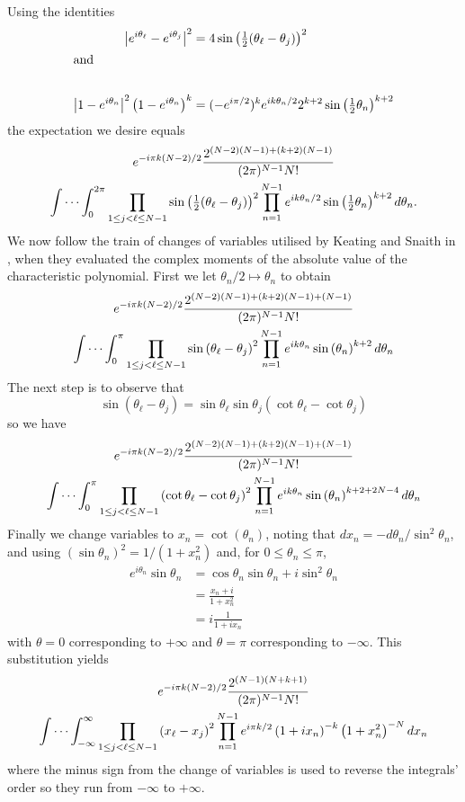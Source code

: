 \documentclass[12pt,a4paper,reqno]{amsart}
\theoremstyle{remark}
\numberwithin{equation}{section}
\begin{document}
Using the identities
\begin{align*}
\left|e^{i\theta_\ell} - e^{i\theta_j} \right|^2 &= 4\sin\left(\tfrac12(\theta_\ell - \theta_j)\right)^2 \\
\intertext{and}\\
\left|1-e^{i\theta_n}\right|^2 \left(1-e^{i\theta_n}\right)^k  &= (- e^{i\pi /2})^k e^{i k \theta_n/2} 2^{k+2} \sin\left(\tfrac12 \theta_n\right)^{k+2}
\end{align*}
the expectation we desire equals
\begin{multline*}
e^{-i\pi k(N-2)/2} \frac{2^{(N-2)(N-1) + (k+2)(N-1)}}{(2\pi)^{N-1} N!} \\
\idotsint_0^{2\pi} \prod_{1 \leq j < \ell \leq N-1} \sin\left(\tfrac12(\theta_\ell - \theta_j)\right)^2  \prod_{n=1}^{N-1}  e^{i k \theta_n/2} \sin\left(\tfrac12 \theta_n\right)^{k+2}  d\theta_n .
\end{multline*}
We now follow the train of changes of variables utilised by Keating and Snaith in \cite{KS00a}, when they evaluated the complex moments of the absolute value of the characteristic polynomial. First we let $\theta_n/2 \mapsto \theta_n$ to obtain
\begin{multline*}
e^{-i\pi k(N-2)/2} \frac{2^{(N-2)(N-1) + (k+2)(N-1)+(N-1)}}{(2\pi)^{N-1} N!} \\
 \idotsint_0^{\pi} \prod_{1 \leq j < \ell \leq N-1} \sin\left(\theta_\ell - \theta_j\right)^2  \prod_{n=1}^{N-1}  e^{i k \theta_n} \sin\left(\theta_n\right)^{k+2}  d\theta_n
\end{multline*}
The next step is to observe that
\[
\sin(\theta_\ell - \theta_j) = \sin \theta_\ell  \sin \theta_j \left(\cot \theta_\ell  - \cot \theta_j \right)
\]
so we have
\begin{multline*}
e^{-i\pi k(N-2)/2} \frac{2^{(N-2)(N-1) + (k+2)(N-1)+(N-1)}}{(2\pi)^{N-1} N!} \\
 \idotsint_0^{\pi} \prod_{1 \leq j < \ell \leq N-1} \left(\cot \theta_\ell - \cot \theta_j\right)^2  \prod_{n=1}^{N-1}  e^{i k \theta_n} \sin\left(\theta_n\right)^{k+2+2N-4}  d\theta_n
\end{multline*}
Finally we change variables to $x_n = \cot(\theta_n)$, noting that $d x_n= - d\theta_n/\sin^2\theta_n$, and using $(\sin \theta_n)^2 = 1/(1+x_n^2)$ and, for $0 \leq \theta_n \leq \pi$,
\begin{align*}
e^{i\theta_n} \sin \theta_n &= \cos \theta_n \sin\theta_n + i \sin^2 \theta_n \\
&= \frac{x_n + i }{1+x_n^2} \\
&= i \frac{1}{1+i x_n}
\end{align*}
with $\theta=0$ corresponding to $+\infty$ and $\theta=\pi$ corresponding to $-\infty$. This substitution yields
\begin{multline*}
e^{-i\pi k(N-2)/2} \frac{2^{(N-1)(N+k+1)}}{(2\pi)^{N-1} N!} \\
 \idotsint_{-\infty}^{\infty} \prod_{1 \leq j < \ell \leq N-1} \left(x_\ell - x_j\right)^2  \prod_{n=1}^{N-1} e^{i \pi k /2} \left(1+i x_n\right)^{-k}  \left(1+x_n^2\right)^{-N}  d x_n
\end{multline*}
where the minus sign from the change of variables is used to reverse the integrals' order so they run from $-\infty$ to $+\infty$.
\end{document}

